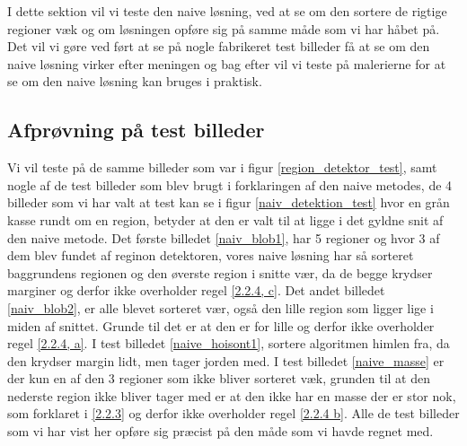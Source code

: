 I dette sektion vil vi teste den naive løsning, ved at se om den sortere
de rigtige regioner væk og om løsningen opføre sig på samme måde som vi
har håbet på. Det vil vi gøre ved ført at se på nogle fabrikeret test
billeder få at se om den naive løsning virker efter meningen og bag
efter vil vi teste på malerierne for at se om den naive løsning kan
bruges i praktisk.
  
\subsection{Afprøvning på test billeder}
Vi vil teste på de samme billeder som var i figur
\ref{region_detektor_test}, samt nogle af de test billeder som blev
brugt i forklaringen af den naive metodes, de 4 billeder som vi har valt
at test kan se i figur \ref{naiv_detektion_test} hvor en grån kasse
rundt om en region, betyder at den er valt til at ligge i det gyldne
snit af den naive metode. Det første billedet \ref{naiv_blob1}, har 5
regioner og hvor 3 af dem blev fundet af reginon detektoren, vores naive
løsning har så sorteret baggrundens regionen og den øverste region i
snitte vær, da de begge krydser marginer og derfor ikke overholder regel
\ref{2.2.4, c}. Det andet billedet \ref{naiv_blob2}, er alle blevet
sorteret vær, også den lille region som ligger lige i miden af snittet.
Grunde til det er at den er for lille og derfor ikke overholder regel
\ref{2.2.4, a}. I test billedet \ref{naive_hoisont1}, sortere algoritmen
himlen fra, da den krydser margin lidt, men tager jorden med. I test
billedet \ref{naive_masse} er der kun en af den 3 regioner som ikke
bliver sorteret væk, grunden til at den nederste region ikke bliver
tager med er at den ikke har en masse der er stor nok, som forklaret i
\ref{2.2.3} og derfor ikke overholder regel \ref{2.2.4 b}. Alle de test
billeder som vi har vist her opføre sig præcist på den måde som vi havde
regnet med.

